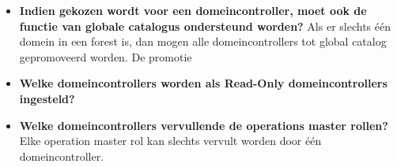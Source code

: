 \begin{enumerate}
{\begin{itemize}
\begin{itemize}
					\item \textbf{Role Services:} optionele, meer complexe server rollen.
					\item \textbf{Features:} Ondersteunende functionaliteit zoals backups of SNMP.
				\end{itemize}
				Er moet minimaal 1 domeincontroller in een domein zitten. Doorgaans wordt er maar een beperkt aantal servers als domeincontrollers ingesteld aangezien domeincontrollers veel netwerkverkeer veroorzaken. Domeincontrollers moeten over genoeg geheugen beschikken, zoniet zal er nagenoeg voortdurend schijfactiviteit zijn.
				\item \textbf{Indien gekozen wordt voor een domeincontroller, moet ook de functie van globale catalogus ondersteund worden?} Als er slechts één domein in een forest is, dan mogen alle domeincontrollers tot global catalog gepromoveerd worden. De promotie 
				\item \textbf{Welke domeincontrollers worden als Read-Only domeincontrollers ingesteld?}
				\item \textbf{Welke domeincontrollers vervullende de operations master rollen?} Elke operation master rol kan slechts vervult worden door één domeincontroller.
			\end{itemize}
		}
	\end{enumerate}